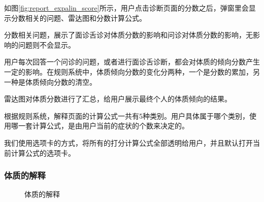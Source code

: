 如图\ref{fig:report_expalin_score}所示，用户点击诊断页面的分数之后，弹窗里会显示分数相关的问题、雷达图和分数计算公式。

分数相关问题，展示了面诊舌诊对体质分数的影响和问诊对体质分数的影响，无影响的问题则不会显示。

用户每次回答一个问诊的问题，或者进行面诊舌诊断，都会对体质的倾向分数产生一定的影响。在规则系统中，体质倾向分数的变化分两种，一个是分数的累加，另一种是体质倾向分数的清空。

雷达图对体质分数进行了汇总，给用户展示最终个人的体质倾向的结果。

根据规则系统，解释页面的计算公式一共有5种类别。用户具体属于哪个类别，使用哪一套计算公式，是由用户当前的症状的个数来决定的。

我们使用选项卡的方式，将所有的打分计算公式全部透明给用户，并且默认打开当前计算公式的选项卡。

\subsubsection{体质的解释}

\begin{figure}[h]
    \centering
    \caption{体质的解释}
    \label{fig:report_explain_phy_1}
\end{figure}

